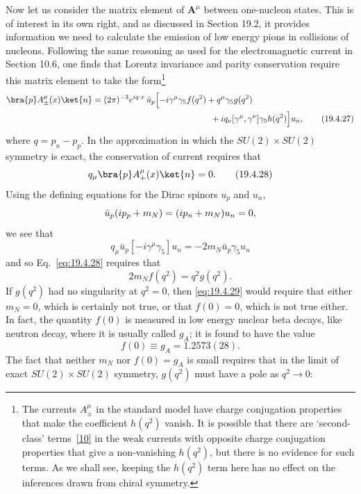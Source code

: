 Now let us consider the matrix element of $\mathbf{A}^\mu$ between one-nucleon states. This is of interest in its own right, and as discussed in Section 19.2, it provides information we need to calculate the emission of low energy pions in collisions of nucleons. Following the same reasoning as used for the electromagnetic current in Section 10.6, one finds that Lorentz invariance and parity conservation require this matrix element to take the form\footnote{The currents $A_\pm^\mu$ in the standard model have charge conjugation properties that make the coefficient $h(q^2)$ vanish. It is possible that there are `second-class' terms~\hyperref[ch19-ref-10]{[10]} in the weak currents with opposite charge conjugation properties that give a non-vanishing $h(q^2)$, but there is no evidence for such terms. As we shall see, keeping the $h(q^2)$ term here has no effect on the inferences drawn from chiral symmetry.}
\begin{align}
\bra{p}A_\pm^\mu(x)\ket{n}
={}&(2\pi)^{-3}e^{iq\cdot x}\,
\bar u_p\Bigl[
-i\gamma^\mu\gamma_5 f(q^2)
+q^\mu\gamma_5 g(q^2)
\notag\\
&\hspace{44mm}
+i q_\nu[\gamma^\mu,\gamma^\nu]\gamma_5h(q^2)
\Bigr]u_n,
\tag{19.4.27}\label{eq:19.4.27}
\end{align}
where $q=p_n-p_p$. In the approximation in which the $SU(2)\times SU(2)$ symmetry is exact, the conservation of current requires that
\begin{equation}
q_\mu\bra{p}A_+^\mu(x)\ket{n}=0.
\tag{19.4.28}\label{eq:19.4.28}
\end{equation}
Using the defining equations for the Dirac spinors $u_p$ and $u_n$,
\[
\bar u_p(i\sl{p}_p+m_N)=(i\sl{p}_n+m_N)u_n=0,
\]
we see that
\[
q_\mu\bar u_p[-i\gamma^\mu\gamma_5]u_n
=-2m_N\bar u_p\gamma_5u_n
\]
and so Eq.~\eqref{eq:19.4.28} requires that
\begin{equation}
2m_Nf(q^2)=q^2g(q^2).
\tag{19.4.29}\label{eq:19.4.29}
\end{equation}
If $g(q^2)$ had no singularity at $q^2=0$, then \eqref{eq:19.4.29} would require that either $m_N=0$, which is certainly not true, or that $f(0)=0$, which is not true either. In fact, the quantity $f(0)$ is measured in low energy nuclear beta decays, like neutron decay, where it is usually called $g_A$; it is found to have the value
\begin{equation}
f(0)\equiv g_A=1.2573(28).
\tag{19.4.30}\label{eq:19.4.30}
\end{equation}
The fact that neither $m_N$ nor $f(0)=g_A$ is small requires that in the limit of exact $SU(2)\times SU(2)$ symmetry, $g(q^2)$ must have a pole as $q^2\to0$:

